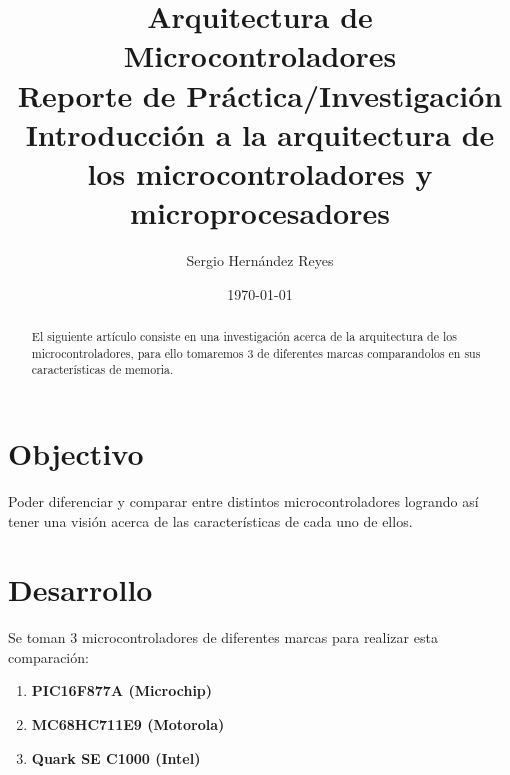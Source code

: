 \documentclass{article}
\title{Arquitectura de Microcontroladores \\ Reporte de Práctica/Investigación \\ Introducción a la arquitectura de los microcontroladores y microprocesadores} %
\author{Sergio Hernández Reyes} %
\date{\today} %
\begin{document}
\maketitle %



 \begin{abstract}
 El siguiente artículo consiste en una investigación acerca de la arquitectura de los microcontroladores, para ello tomaremos 3 de diferentes marcas comparandolos en sus características de memoria.
 \end{abstract}


\section{Objectivo}

Poder diferenciar y comparar entre distintos microcontroladores logrando así tener una visión acerca de las características de cada uno de ellos.



\section{Desarrollo}
Se toman 3 microcontroladores de diferentes marcas para realizar esta comparación:

\begin{enumerate}
    \item {\bf PIC16F877A (Microchip)}
    \item {\bf MC68HC711E9 (Motorola)}
    \item {\bf Quark SE C1000 (Intel)}
\end{enumerate}


\end{document}
